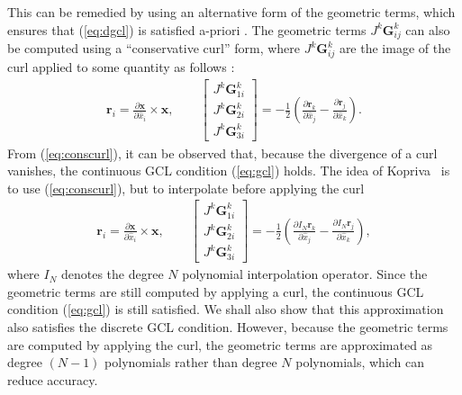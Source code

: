\documentclass[preprint,10pt]{article}
\theoremstyle{definition}
\theoremstyle{lemma}
\theoremstyle{theorem}
\theoremstyle{assumption}
\renewcommand{\hat}{\widehat}
\newcommand{\pd}[2]{\frac{\partial#1}{\partial#2}}
\newcommand{\LRp}[1]{\left( #1 \right)}
\newcommand{\LRs}[1]{\left[ #1 \right]}
\newcommand{\Grad} {\ensuremath{\nabla}}
\begin{document}
{This can be remedied by using an alternative form of the geometric terms, which ensures that (\ref{eq:dgcl}) is satisfied a-priori \cite{thomas1979geometric, visbal2002use, kopriva2006metric}.  The geometric terms $J^k\bm{G}^k_{ij}$ can also be computed using a ``conservative curl'' form, where $J^k\bm{G}^k_{ij}$ are the image of the curl applied to some quantity
 as follows \cite{hindenlang2012explicit}:
\begin{align}
\bm{r}_i = \pd{\bm{x}}{\hat{x}_i}\times \bm{x}, \qquad
\LRs{\begin{array}{c}
J^k\bm{G}^k_{1i}\\
J^k\bm{G}^k_{2i}\\
J^k\bm{G}^k_{3i}\end{array}} = -\frac{1}{2}\LRp{\pd{\bm{r}_k}{\hat{x}_j}-\pd{\bm{r}_j}{\hat{x}_k}}.
\label{eq:conscurl}
\end{align}
From (\ref{eq:conscurl}), it can be observed that, because the divergence of a curl vanishes, the continuous GCL condition (\ref{eq:gcl}) holds.  
The idea of Kopriva~\cite{kopriva2006metric} is to use (\ref{eq:conscurl}), but to interpolate before applying the curl  %
\begin{align}
\bm{r}_i = { \pd{\bm{x}}{\hat{x}_i}\times \bm{x}}, \qquad
\LRs{\begin{array}{c}
J^k\bm{G}^k_{1i}\\
J^k\bm{G}^k_{2i}\\
J^k\bm{G}^k_{3i}\end{array}} = -\frac{1}{2}\LRp{\pd{I_N\bm{r}_k}{\hat{x}_j}-\pd{I_N\bm{r}_j}{\hat{x}_k}}, 
\label{eq:iconscurl}
\end{align}
where $I_N$ denotes the degree $N$ polynomial interpolation operator. Since the geometric terms are still computed by applying a curl, the continuous GCL condition (\ref{eq:gcl}) is still satisfied. We shall also show that this approximation also satisfies the discrete GCL condition. However, because the geometric terms are computed by applying the curl, the geometric terms are approximated as degree $(N-1)$ polynomials rather than degree $N$ polynomials, which can reduce accuracy.  

}
\end{document}
